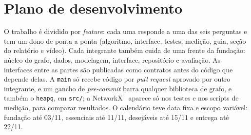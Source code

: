 \section{Plano de desenvolvimento}\label{sec:plano}

O trabalho é dividido por \emph{feature}: cada uma responde a uma das seis perguntas e tem um
dono de ponta a ponta (algoritmo, interface, testes, medição, guia, seção do relatório e vídeo).
Cada integrante também cuida de uma frente da fundação: núcleo do grafo, dados, modelagem,
interface, repositório e avaliação. As interfaces entre as partes são publicadas como contratos
antes do código que depende delas. A \texttt{main} só recebe código por \emph{pull request}
aprovado por outro integrante, e um gancho de \emph{pre-commit} barra qualquer biblioteca de
grafo, e também o \texttt{heapq}, em \texttt{src/}; a NetworkX~\cite{hagberg2008} aparece só
nos testes e nos scripts de medição, para comparar resultados. O calendário teve data fixa e
escopo variável: fundação até 03/11, essenciais até 11/11, desejáveis até 15/11 e entrega até
22/11.

